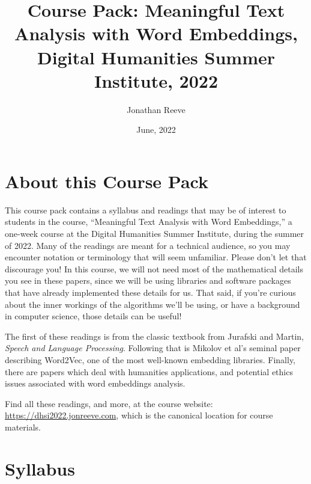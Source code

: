 \documentclass[a4paper]{report}
\title{Course Pack: Meaningful Text Analysis with Word Embeddings, Digital Humanities Summer Institute, 2022}
\author{Jonathan Reeve}
\date{June, 2022}
\begin{document}
\maketitle

\tableofcontents

\chapter{About this Course Pack}

This course pack contains a syllabus and readings that may be of interest to students in the course, ``Meaningful Text Analysis with Word Embeddings,'' a one-week course at the Digital Humanities Summer Institute, during the summer of 2022. Many of the readings are meant for a technical audience, so you may encounter notation or terminology that will seem unfamiliar. Please don't let that discourage you! In this course, we will not need most of the mathematical details you see in these papers, since we will be using libraries and software packages that have already implemented these details for us. That said, if you're curious about the inner workings of the algorithms we'll be using, or have a background in computer science, those details can be useful!

The first of these readings is from the classic textbook from Jurafski and Martin, \emph{Speech and Language Processing}. Following that is Mikolov et al's seminal paper describing Word2Vec, one of the most well-known embedding libraries. Finally, there are papers which deal with humanities applications, and potential ethics issues associated with word embeddings analysis.

Find all these readings, and more, at the course website: \url{https://dhsi2022.jonreeve.com}, which is the canonical location for course materials.




\chapter{Syllabus}
\end{document}

